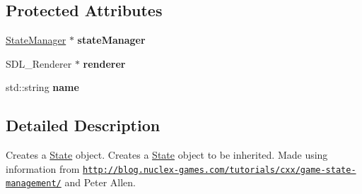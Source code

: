 \subsection*{Protected Attributes}
\begin{DoxyCompactItemize}
\item 
\hypertarget{class_state_a78388f59b0a570faa4b7ea640fea668e}{\hyperlink{class_state_manager}{State\+Manager} $\ast$ {\bfseries state\+Manager}}\label{class_state_a78388f59b0a570faa4b7ea640fea668e}

\item 
\hypertarget{class_state_ad79f979055823ec66fb7919e90ddd5c9}{S\+D\+L\+\_\+\+Renderer $\ast$ {\bfseries renderer}}\label{class_state_ad79f979055823ec66fb7919e90ddd5c9}

\item 
\hypertarget{class_state_ad57f19fd0a86f129840d8739253d2c72}{std\+::string {\bfseries name}}\label{class_state_ad57f19fd0a86f129840d8739253d2c72}

\end{DoxyCompactItemize}


\subsection{Detailed Description}
Creates a \hyperlink{class_state}{State} object. Creates a \hyperlink{class_state}{State} object to be inherited. Made using information from \href{http://blog.nuclex-games.com/tutorials/cxx/game-state-management/}{\tt http\+://blog.\+nuclex-\/games.\+com/tutorials/cxx/game-\/state-\/management/} and Peter Allen. 

